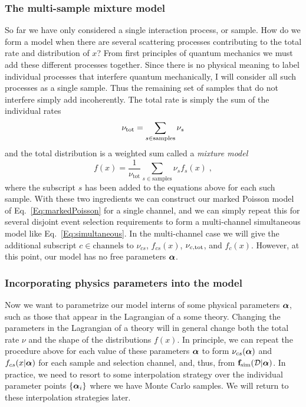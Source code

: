 \documentclass{cernrep}
\def\vec#1{\ifmmode
\mathchoice{\mbox{\boldmath$\displaystyle\bf#1$}}
{\mbox{\boldmath$\textstyle\bf#1$}}
{\mbox{\boldmath$\scriptstyle\bf#1$}}
{\mbox{\boldmath$\scriptscriptstyle\bf#1$}}\else
{\mbox{\boldmath$\bf#1$}}\fi}
\newcommand{\data}{{\ensuremath{\mathcal{D}}}}
\newcommand{\F}{{\ensuremath{\mathbf{f}}}}
\begin{document}
\subsubsection{The multi-sample mixture model}
So far we have only considered a single interaction process, or sample.  How do we form a model when there are several scattering processes contributing to the total rate and distribution of $x$?  From first principles of quantum mechanics we must add these different processes together.  Since there is no physical meaning to label individual processes that interfere quantum mechanically, I will consider all such processes as a single sample.  Thus the remaining set of samples that do not interfere simply add incoherently.  The total rate is simply the sum of the individual rates
\begin{equation}
\nu_{\rm tot} = \sum_{s\in\textrm{samples}} \nu_s
\end{equation}
and the total distribution is a weighted sum called a \textit{mixture model}
\begin{equation}
f(x) = \frac{1}{\nu_{\textrm{tot}}} \sum_{s\in\textrm{samples}} \nu_s f_s(x)\;,
\end{equation}
where the subscript $s$ has been added to the equations above for each such sample.  With these two ingredients we can construct our  marked Poisson model of Eq.~\ref{Eq:markedPoisson} for a single channel, and we can simply repeat this for several disjoint event selection requirements to form a multi-channel simultaneous model like Eq.~\ref{Eq:simultaneous}.  In the multi-channel case we will give the additional subscript $c\in\textrm{channels}$ to $\nu_{cs}$, $f_{cs}(x)$, $\nu_{c,\rm{tot}}$, and $f_c(x)$. However, at this point, our model has no free parameters $\vec\alpha$.

\subsubsection{Incorporating physics parameters into the model}

Now we want to parametrize our model interns of some physical parameters $\vec\alpha$, such as those that appear in the Lagrangian of a some theory.  Changing the parameters in the Lagrangian of a theory will in general change both the total rate $\nu$ and the shape of the distributions $f(x)$.  In principle, we can repeat the procedure above for each value of these parameters $\vec\alpha$ to form $\nu_{cs}(\vec\alpha)$ and $f_{cs}(x|\vec\alpha)$ for each sample and selection channel, and, thus, from $\F_\textrm{sim}(\data|\vec\alpha)$.  In practice, we need to resort to some interpolation strategy over the individual parameter points $\{\vec\alpha_i\}$ where we have Monte Carlo samples.  We will return to these interpolation strategies later.
\end{document}
